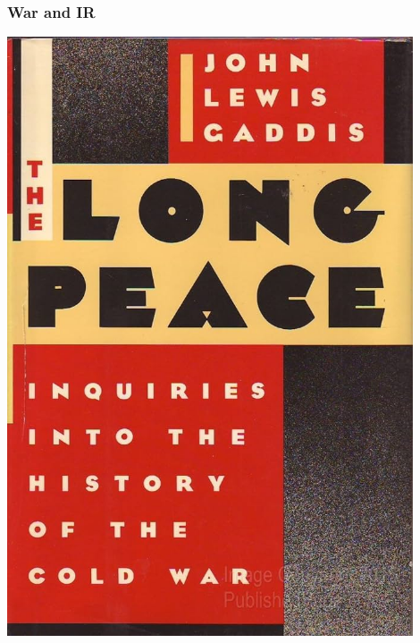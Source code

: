 \documentclass[aspectratio=43]{beamer}
\begin{document}
\begin{frame}
\frametitle{War and IR}
\centering

\begin{minipage}{.49\textwidth}\centering
\includegraphics[width = 0.9\textwidth]{img/longpeace}
\end{minipage}\hfill
\begin{minipage}{.49\textwidth}\centering

\end{minipage}
\end{frame}
\end{document}
